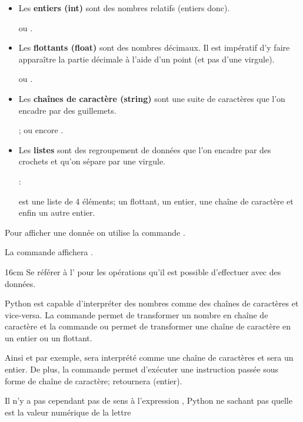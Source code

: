 \begin{itemize}
\item Les \textbf{entiers (int)} sont des nombres relatifs (entiers donc).

  ou .
\item Les \textbf{flottants (float)} sont des nombres décimaux. Il est impératif d'y faire apparaître la partie décimale à l'aide d'un point (et pas d'une virgule).

  ou .
\item Les \textbf{chaînes de caractère (string)} sont une suite de caractères que l'on encadre par des guillemets.

  ;  ou encore .
\item Les \textbf{listes} sont des regroupement de données que l'on encadre par des crochets et qu'on sépare par une virgule.

 : \begin{minipage}[t]{0.8\textwidth}
 est une liste de 4 éléments; un flottant, un entier, une chaîne de caractère et enfin un autre entier.
\end{minipage}
\end{itemize}

Pour afficher une donnée on utilise la commande \textbf{}.

\smallskip
{} La commande \textbf{} affichera \textbf{}.


\medskip
\begin{encadre}{16cm}
Se référer à l' pour les opérations qu'il est possible d'effectuer avec des données.
\end{encadre}

\bigskip
\begin{remarque}
Python est capable d'interpréter des nombres comme des chaînes de caractères et vice-versa. La commande  permet de transformer un nombre en chaîne de caractère et la commande  ou  permet de transformer une chaîne de caractère en un entier ou un flottant.

\smallskip
Ainsi et par exemple,  sera interprété comme une chaîne de caractères et  sera un entier. De plus, la commande  permet d'exécuter une instruction passée sous forme de chaîne de caractère;  retournera  (entier).

\smallskip
Il n'y a pas cependant pas de sens à l'expression , Python ne sachant pas quelle est la valeur numérique de la lettre 
\end{remarque}



